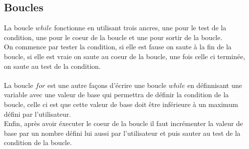 \documentclass[a4paper,10pt]{article}
\begin{document}
\subsection{Boucles}
La boucle $while$ fonctionne en utilisant trois ancres, une pour le test de la condition, une pour le coeur de la boucle et une pour sortir de la boucle.\\
On commence par tester la condition, si elle est fause on saute à la fin de la boucle, si elle est vraie on saute au coeur de la boucle, une fois celle ci terminée, on saute au test de la condition.\\\\
La boucle $for$ est une autre façons d'écrire une boucle $while$ en définnisant une variable avec une valeur de base qui permettra de définir la condition de la boucle, celle ci est que cette valeur de base doit être inférieure à un maximum défini par l'utilisateur.\\
Enfin, après avoir éxecuter le coeur de la boucle il faut incrémenter la valeur de base par un nombre défini lui aussi par l'utilisateur et puis sauter au test de la condition de la boucle.
\end{document}
